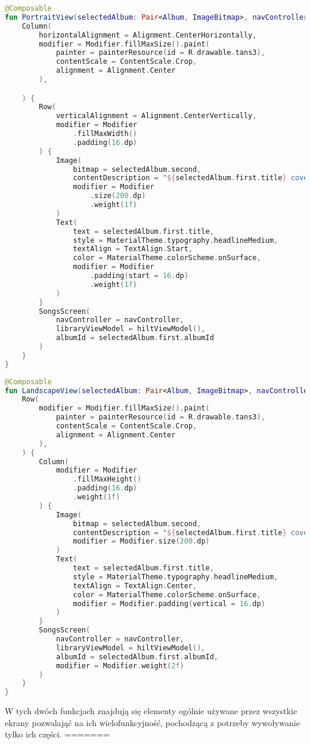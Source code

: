 \begin{lstlisting}[caption=Kod \texttt{Navhost PortraitView}, label={lst:Navhost_P}, language=kotlin]
@Composable
fun PortraitView(selectedAlbum: Pair<Album, ImageBitmap>, navController: NavHostController) {
    Column(
        horizontalAlignment = Alignment.CenterHorizontally,
        modifier = Modifier.fillMaxSize().paint(
            painter = painterResource(id = R.drawable.tans3),
            contentScale = ContentScale.Crop,
            alignment = Alignment.Center
        ),

    ) {
        Row(
            verticalAlignment = Alignment.CenterVertically,
            modifier = Modifier
                .fillMaxWidth()
                .padding(16.dp)
        ) {
            Image(
                bitmap = selectedAlbum.second,
                contentDescription = "${selectedAlbum.first.title} cover",
                modifier = Modifier
                    .size(200.dp)
                    .weight(1f)
            )
            Text(
                text = selectedAlbum.first.title,
                style = MaterialTheme.typography.headlineMedium,
                textAlign = TextAlign.Start,
                color = MaterialTheme.colorScheme.onSurface,
                modifier = Modifier
                    .padding(start = 16.dp)
                    .weight(1f)
            )
        }
        SongsScreen(
            navController = navController,
            libraryViewModel = hiltViewModel(),
            albumId = selectedAlbum.first.albumId
        )
    }
}    
\end{lstlisting}
\begin{lstlisting}[caption=Kod \texttt{Navhost LandscapeView}, label={lst:Navhost_L}, language=kotlin]
@Composable
fun LandscapeView(selectedAlbum: Pair<Album, ImageBitmap>, navController: NavHostController) {
    Row(
        modifier = Modifier.fillMaxSize().paint(
            painter = painterResource(id = R.drawable.tans3),
            contentScale = ContentScale.Crop,
            alignment = Alignment.Center
        ),
    ) {
        Column(
            modifier = Modifier
                .fillMaxHeight()
                .padding(16.dp)
                .weight(1f)
        ) {
            Image(
                bitmap = selectedAlbum.second,
                contentDescription = "${selectedAlbum.first.title} cover",
                modifier = Modifier.size(200.dp)
            )
            Text(
                text = selectedAlbum.first.title,
                style = MaterialTheme.typography.headlineMedium,
                textAlign = TextAlign.Center,
                color = MaterialTheme.colorScheme.onSurface,
                modifier = Modifier.padding(vertical = 16.dp)
            )
        }
        SongsScreen(
            navController = navController,
            libraryViewModel = hiltViewModel(),
            albumId = selectedAlbum.first.albumId,
            modifier = Modifier.weight(2f)
        )
    }
}    
\end{lstlisting}
W tych dwóch funkcjach znajdują się elementy ogólnie używane przez wszystkie ekrany pozwalająć na ich wielofunkcyjność, pochodzącą z potrzeby wywoływanie tylko ich części.
=======
	\newpage
